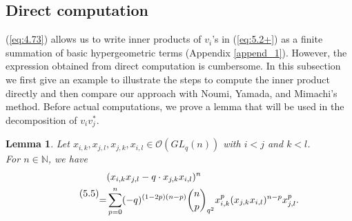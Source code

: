 \documentclass[table,a4paper,reqno]{amsart}
\numberwithin{equation}{section}
\newtheorem{lemma}[theorem]{Lemma}
\theoremstyle{definition}
\begin{document}
\subsection{Direct computation}
(\ref{eq:4.73}) allows us to write inner products of $v_i$'s in (\ref{eq:5.2+}) as a finite summation of basic hypergeometric terms (Appendix \ref{append_1}). However, the expression obtained from direct computation is cumbersome. In this subsection we first give an example to illustrate the steps to compute the inner product directly and then compare our approach with Noumi, Yamada, and Mimachi's method. Before actual computations, we prove a lemma that will be used in the decomposition of $v_iv_j^*$. 
\begin{lemma}
    Let $x_{i,k}, x_{j,l}, x_{j,k}, x_{i,l}\in\mathcal{O}(GL_q(n))$ with $i<j$ and $k<l$.\\
    For $n\in\mathbb{N}$, we have
    \begin{equation}\tag{5.5}\label{eq:5.4.a}\stepcounter{equation}
            \begin{split}
                &(x_{i,k}x_{j,l}-q\cdot x_{j,k}x_{i,l})^n\\
                =&\sum_{p=0}^n(-q)^{(1-2p)(n-p)}{n\choose p}_{q^2}x_{i,k}^p(x_{j,k}x_{i,l})^{n-p}x_{j,l}^p.
            \end{split}
        \end{equation}
\end{lemma}
\end{document}
